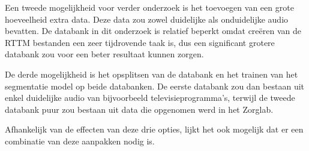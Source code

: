 Een tweede mogelijkheid voor verder onderzoek is het toevoegen van een grote hoeveelheid extra data. Deze data zou zowel duidelijke als onduidelijke audio bevatten. De databank in dit onderzoek is relatief beperkt omdat creëren van de RTTM bestanden een zeer tijdrovende taak is, dus een significant grotere databank zou voor een beter resultaat kunnen zorgen.

De derde mogelijkheid is het opsplitsen van de databank en het trainen van het segmentatie model op beide databanken. De eerste databank zou dan bestaan uit enkel duidelijke audio van bijvoorbeeld televisieprogramma's, terwijl de tweede databank puur zou bestaan uit data die opgenomen werd in het Zorglab.

Afhankelijk van de effecten van deze drie opties, lijkt het ook mogelijk dat er een combinatie van deze aanpakken nodig is.